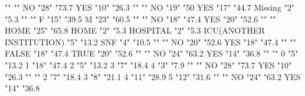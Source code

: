 \documentclass{article}\usepackage[]{graphicx}\usepackage[]{color}
\begin{document}
                                    ""             ""     
NO                                  "28"           "73.7%
YES                                 "10"           "26.3%
                                    ""             ""     
NO                                  "19"           "50%
YES                                 "17"           "44.7%
Missing                             "2"            "5.3%
                                    ""             ""     
F                                   "15"           "39.5%
M                                   "23"           "60.5%
                                    ""             ""     
NO                                  "18"           "47.4%
YES                                 "20"           "52.6%
                                    ""             ""     
HOME                                "25"           "65.8%
HOME                                "2"            "5.3%
HOSPITAL                            "2"            "5.3%
ICU(ANOTHER INSTITUTION)            "5"            "13.2%
SNF                                 "4"            "10.5%
                                    ""             ""     
NO                                  "20"           "52.6%
YES                                 "18"           "47.4%
                                    ""             ""     
FALSE                               "18"           "47.4%
TRUE                                "20"           "52.6%
                                    ""             ""     
NO                                  "24"           "63.2%
YES                                 "14"           "36.8%
                                    ""             ""     
0                                   "5"            "13.2%
1                                   "18"           "47.4%
2                                   "5"            "13.2%
3                                   "7"            "18.4%
4                                   "3"            "7.9%
                                    ""             ""     
NO                                  "28"           "73.7%
YES                                 "10"           "26.3%
                                    ""             ""     
2                                   "7"            "18.4%
3                                   "8"            "21.1%
4                                   "11"           "28.9%
5                                   "12"           "31.6%
                                    ""             ""     
NO                                  "24"           "63.2%
YES                                 "14"           "36.8%
\end{document}
